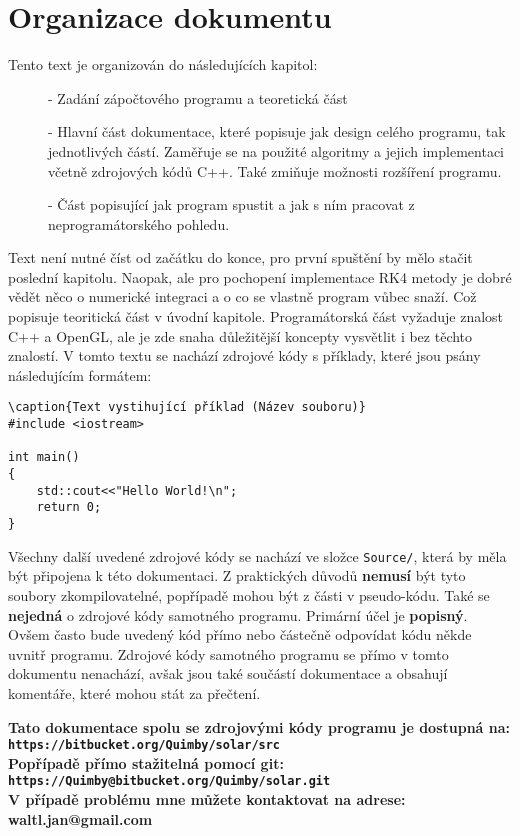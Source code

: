 
\chapter*{Organizace dokumentu}
Tento text je organizován do následujících kapitol:
\begin{description}
	\item[] - Zadání zápočtového programu a teoretická část
	\item[] - Hlavní část dokumentace, které popisuje jak design celého programu, tak jednotlivých částí. Zaměřuje se na použité algoritmy a jejich implementaci včetně zdrojových kódů C++.
	Také zmiňuje možnosti rozšíření programu.
	\item[] - Část popisující jak program spustit a jak s ním pracovat z neprogramátorského pohledu.
	
\end{description}
Text není nutné číst od začátku do konce, pro první spuštění by mělo stačit poslední kapitolu. Naopak, ale pro pochopení implementace RK4 metody je dobré vědět něco o numerické integraci a o co se vlastně program vůbec snaží. Což popisuje teoritická část v úvodní kapitole. Programátorská část vyžaduje znalost C++ a OpenGL, ale je zde snaha důležitější koncepty vysvětlit  i bez těchto znalostí. V tomto textu se nachází  zdrojové kódy s příklady, které jsou psány následujícím formátem:
\begin{lstlisting}
\caption{Text vystihující příklad (Název souboru)}
#include <iostream>

int main()
{
	std::cout<<"Hello World!\n";
	return 0;
}
\end{lstlisting}
Všechny další uvedené zdrojové kódy se nachází ve složce \texttt{Source/}, která
by měla být připojena k této dokumentaci. Z praktických důvodů \textbf{nemusí} být tyto soubory zkompilovatelné, popřípadě mohou být z části v pseudo-kódu. Také se \textbf{nejedná} o zdrojové kódy samotného programu. Primární účel je \textbf{popisný}. Ovšem často bude uvedený kód přímo nebo částečně odpovídat kódu někde uvnitř programu.
Zdrojové kódy samotného programu se přímo v tomto dokumentu nenachází, avšak jsou také součástí dokumentace a obsahují komentáře, které mohou stát za přečtení.
\vfill
\begin{center}
\textbf{	
Tato dokumentace spolu se zdrojovými kódy programu je dostupná na:\\
\texttt{https://bitbucket.org/Quimby/solar/src}\\
Popřípadě přímo stažitelná pomocí git:	\\
\texttt{https://Quimby@bitbucket.org/Quimby/solar.git}\\
V případě problému mne můžete kontaktovat na adrese: waltl.jan@gmail.com
}
\end{center}
